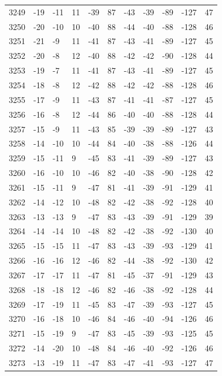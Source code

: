 \begin{table}[H]
\begin{tabular}{lllllllllll}
3249 & -19 & -11 & 11 & -39 & 87 & -43 & -39 & -89 & -127 & 47 \\
3250 & -20 & -10 & 10 & -40 & 88 & -44 & -40 & -88 & -128 & 46 \\
3251 & -21 & -9 & 11 & -41 & 87 & -43 & -41 & -89 & -127 & 45 \\
3252 & -20 & -8 & 12 & -40 & 88 & -42 & -42 & -90 & -128 & 44 \\
3253 & -19 & -7 & 11 & -41 & 87 & -43 & -41 & -89 & -127 & 45 \\
3254 & -18 & -8 & 12 & -42 & 88 & -42 & -42 & -88 & -128 & 46 \\
3255 & -17 & -9 & 11 & -43 & 87 & -41 & -41 & -87 & -127 & 45 \\
3256 & -16 & -8 & 12 & -44 & 86 & -40 & -40 & -88 & -128 & 44 \\
3257 & -15 & -9 & 11 & -43 & 85 & -39 & -39 & -89 & -127 & 43 \\
3258 & -14 & -10 & 10 & -44 & 84 & -40 & -38 & -88 & -126 & 44 \\
3259 & -15 & -11 & 9 & -45 & 83 & -41 & -39 & -89 & -127 & 43 \\
3260 & -16 & -10 & 10 & -46 & 82 & -40 & -38 & -90 & -128 & 42 \\
3261 & -15 & -11 & 9 & -47 & 81 & -41 & -39 & -91 & -129 & 41 \\
3262 & -14 & -12 & 10 & -48 & 82 & -42 & -38 & -92 & -128 & 40 \\
3263 & -13 & -13 & 9 & -47 & 83 & -43 & -39 & -91 & -129 & 39 \\
3264 & -14 & -14 & 10 & -48 & 82 & -42 & -38 & -92 & -130 & 40 \\
3265 & -15 & -15 & 11 & -47 & 83 & -43 & -39 & -93 & -129 & 41 \\
3266 & -16 & -16 & 12 & -46 & 82 & -44 & -38 & -92 & -130 & 42 \\
3267 & -17 & -17 & 11 & -47 & 81 & -45 & -37 & -91 & -129 & 43 \\
3268 & -18 & -18 & 12 & -46 & 82 & -46 & -38 & -92 & -128 & 44 \\
3269 & -17 & -19 & 11 & -45 & 83 & -47 & -39 & -93 & -127 & 45 \\
3270 & -16 & -18 & 10 & -46 & 84 & -46 & -40 & -94 & -126 & 46 \\
3271 & -15 & -19 & 9 & -47 & 83 & -45 & -39 & -93 & -125 & 45 \\
3272 & -14 & -20 & 10 & -48 & 84 & -46 & -40 & -92 & -126 & 46 \\
3273 & -13 & -19 & 11 & -47 & 83 & -47 & -41 & -93 & -127 & 47 \\

\end{tabular}
\end{table}
